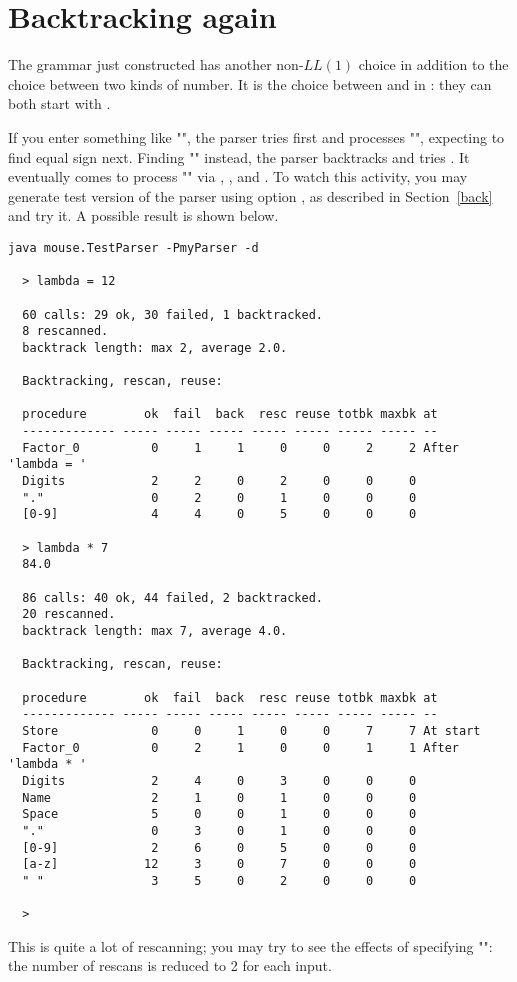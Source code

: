 
\section{Backtracking again\label{back2}}


The grammar just constructed has another non-$LL(1)$ choice
in addition to the choice between two kinds of number.
It is the choice between  and  in \Input: 
they can both start with .

If you enter something like "",
the parser tries  first and processes "",
expecting to find equal sign next.
Finding "\tx{*}" instead, the parser backtracks and tries .
It eventually comes to process "" via , ,
and .
To watch this activity, you may generate test version of the parser using option ,
as described in Section~\ref{back} and try it.
A possible result is shown below.

\small
\begin{Verbatim}[samepage=true,xleftmargin=15mm,xrightmargin=15mm,baselinestretch=0.75]
  java mouse.TestParser -PmyParser -d

  > lambda = 12

  60 calls: 29 ok, 30 failed, 1 backtracked.
  8 rescanned.
  backtrack length: max 2, average 2.0.

  Backtracking, rescan, reuse:

  procedure        ok  fail  back  resc reuse totbk maxbk at
  ------------- ----- ----- ----- ----- ----- ----- ----- --
  Factor_0          0     1     1     0     0     2     2 After 'lambda = '
  Digits            2     2     0     2     0     0     0
  "."               0     2     0     1     0     0     0
  [0-9]             4     4     0     5     0     0     0

  > lambda * 7
  84.0

  86 calls: 40 ok, 44 failed, 2 backtracked.
  20 rescanned.
  backtrack length: max 7, average 4.0.

  Backtracking, rescan, reuse:

  procedure        ok  fail  back  resc reuse totbk maxbk at
  ------------- ----- ----- ----- ----- ----- ----- ----- --
  Store             0     0     1     0     0     7     7 At start
  Factor_0          0     2     1     0     0     1     1 After 'lambda * '
  Digits            2     4     0     3     0     0     0
  Name              2     1     0     1     0     0     0
  Space             5     0     0     1     0     0     0
  "."               0     3     0     1     0     0     0
  [0-9]             2     6     0     5     0     0     0
  [a-z]            12     3     0     7     0     0     0
  " "               3     5     0     2     0     0     0

  >
\end{Verbatim}
\normalsize

This is quite a lot of rescanning; you may try to see the effects of specifying
"":
the number of rescans is reduced to 2 for each input.
